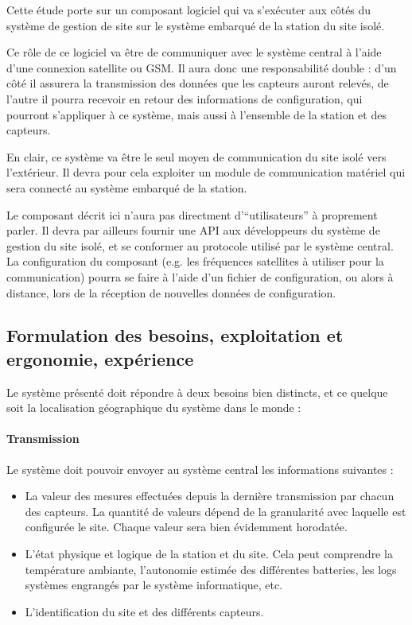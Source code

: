 Cette étude porte sur un composant logiciel qui va s'exécuter aux côtés du système de gestion de site sur le système embarqué de la station du site isolé.

Ce rôle de ce logiciel va être de communiquer avec le système central à l'aide d'une connexion satellite ou GSM. Il aura donc une responsabilité double : d'un côté il assurera la transmission des données que les capteurs auront relevés, de l'autre il pourra recevoir en retour des informations de configuration, qui pourront s'appliquer à ce système, mais aussi à l'ensemble de la station et des capteurs.

En clair, ce système va être le seul moyen de communication du site isolé vers l'extérieur. Il devra pour cela exploiter un module de communication matériel qui sera connecté au système embarqué de la station.

Le composant décrit ici n'aura pas directment d'``utilisateurs'' à proprement parler. Il devra par ailleurs fournir une API aux développeurs du système de gestion du site isolé, et se conformer au protocole utilisé par le système central. La configuration du composant (e.g. les fréquences satellites à utiliser pour la communication) pourra se faire à l'aide d'un fichier de configuration, ou alors à distance, lors de la réception de nouvelles données de configuration.

\subsection{Formulation des besoins, exploitation et ergonomie, expérience}

Le système présenté doit répondre à deux besoins bien distincts, et ce quelque soit la localisation géographique du système dans le monde :

\paragraph{Transmission} Le système doit pouvoir envoyer au système central les informations suivantes :

\begin{itemize}
\item La valeur des mesures effectuées depuis la dernière transmission par chacun des capteurs. La quantité de valeurs dépend de la granularité avec laquelle est configurée le site. Chaque valeur sera bien évidemment horodatée.
\item L'état physique et logique de la station et du site. Cela peut comprendre la température ambiante, l'autonomie estimée des différentes batteries, les logs systèmes engrangés par le système informatique, etc.
\item L'identification du site et des différents capteurs. %
\end{itemize}

